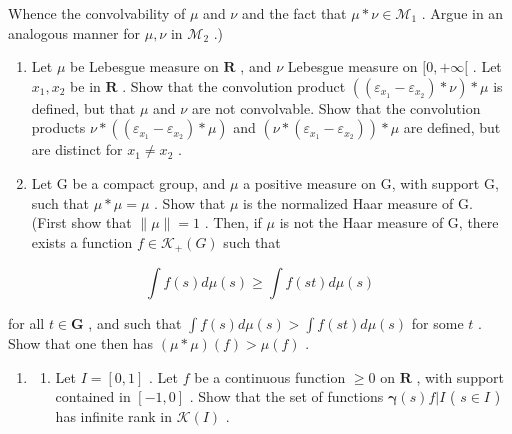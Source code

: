 Whence the convolvability of \(\mu\) and \(\nu\) and the fact that \(\mu * \nu \in \mathcal{M}_1\) . Argue in an analogous manner for \(\mu, \nu\) in \(\mathcal{M}_2\) .)

\begin{enumerate}
\def\labelenumi{\arabic{enumi})}
\setcounter{enumi}{3}
\item
  Let \(\mu\) be Lebesgue measure on \(\mathbf{R}\) , and \(\nu\) Lebesgue measure on \([0, +\infty[\) . Let \(x_1, x_2\) be in \(\mathbf{R}\) . Show that the convolution product \(((\varepsilon_{x_1} - \varepsilon_{x_2}) * \nu) * \mu\) is defined, but that \(\mu\) and \(\nu\) are not convolvable. Show that the convolution products \(\nu * ((\varepsilon_{x_1} - \varepsilon_{x_2}) * \mu)\) and \((\nu * (\varepsilon_{x_1} - \varepsilon_{x_2})) * \mu\) are defined, but are distinct for \(x_1 \neq x_2\) .
\item
  Let G be a compact group, and \(\mu\) a positive measure on G, with support G, such that \(\mu*\mu=\mu\) . Show that \(\mu\) is the normalized Haar measure of G. (First show that \(\|\mu\|=1\) . Then, if \(\mu\) is not the Haar measure of G, there exists a function \(f\in\mathcal{K}_{+}(G)\) such that
\end{enumerate}

\[
\int f (s) d \mu (s) \geqslant \int f (s t) d \mu (s)
\]

for all \(t \in \mathbf{G}\) , and such that \(\int f(s) d\mu(s) > \int f(st) d\mu(s)\) for some \(t\) . Show that one then has \((\mu * \mu)(f) > \mu(f)\) .

\begin{enumerate}
\def\labelenumi{\arabic{enumi})}
\setcounter{enumi}{5}
\tightlist
\item
  \begin{enumerate}
  \def\labelenumii{\alph{enumii})}
  \tightlist
  \item
    Let \(I = [0,1]\) . Let \(f\) be a continuous function \(\geqslant 0\) on \(\mathbf{R}\) , with support contained in \([-1,0]\) . Show that the set of functions \(\pmb{\gamma}(s)f|I\) ( \(s \in I\) ) has infinite rank in \(\mathcal{K}(I)\) .
  \end{enumerate}
\end{enumerate}

